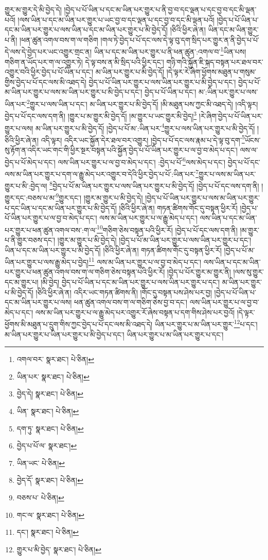 གྱུར་མ་གྱུར་དེ་མི་བྱེད་དེ། །བྱེད་པ་པོ་ཡིན་པ་དང་མ་ཡིན་པར་གྱུར་པ་ནི་བྱ་བ་དང་ལྡན་པ་དང་བྱ་བ་དང་མི་ལྡན་པའོ། །ལས་ཡིན་པ་དང་མ་ཡིན་པར་གྱུར་པ་ཡང་བྱ་བ་དང་ལྡན་པ་དང་བྱ་བ་དང་མི་ལྡན་པའོ། །བྱེད་པ་པོ་ཡིན་པ་དང་མ་ཡིན་པར་གྱུར་པ་ལས་ཡིན་པ་དང་མ་ཡིན་པར་གྱུར་པ་མི་བྱེད་དོ། །ཅིའི་ཕྱིར་ཞེ་ན། ཡིན་དང་མ་ཡིན་གྱུར་པ་ནི། །ཕན་ཚུན་འགལ་བས་ག་ལ་གཅིག །གལ་ཏེ་བྱེད་པ་པོ་དང་ལས་དེ་ལྟ་བུ་དག་སྲིད་པར་གྱུར་ན་ནི་བྱེད་པ་པོ་དེ་ལས་དེ་བྱེད་པར་ཡང་འགྱུར་གྲང་ན། ཡིན་པ་དང་མ་ཡིན་པར་གྱུར་པ་ནི་ཕན་ཚུན་:འགལ་བ་\footnote{འགལ་བར་  སྣར་ཐང་།  པེ་ཅིན། }ཡིན་པས། གཅིག་ན་ཡོད་པར་ག་ལ་འགྱུར་ཏེ། དེ་ལྟ་བས་ན་མི་སྲིད་པའི་ཕྱིར་དང་། གཉི་གའི་སྐྱོན་ཇི་སྐད་བསྟན་པར་ཐལ་བར་འགྱུར་བའི་ཕྱིར་བྱེད་པ་པོ་ཡིན་པ་དང་། མ་ཡིན་པར་གྱུར་པ་མི་བྱེད་དོ། །དེ་ལྟར་རེ་ཞིག་ཕྱོགས་མཐུན་པ་གསུམ་གྱིས་བྱེད་པ་པོ་དང་ལས་མི་འཐད་དེ། བྱེད་པ་པོ་ཡིན་པར་གྱུར་པ་ལས་ཡིན་པར་གྱུར་པ་མི་བྱེད་པ་དང་། བྱེད་པ་པོ་མ་ཡིན་པར་གྱུར་པ་ལས་མ་ཡིན་པར་གྱུར་པ་མི་བྱེད་པ་དང་། བྱེད་པ་པོ་ཡིན་པ་དང་། མ་:ཡིན་པར་གྱུར་པ་ལས་ཡིན་པར་\footnote{ཡིན་པར་  སྣར་ཐང་།  པེ་ཅིན། }གྱུར་པ་ལས་ཡིན་པ་དང་། མ་ཡིན་པར་གྱུར་པ་མི་བྱེད་དོ། །མི་མཐུན་པས་ཀྱང་མི་འཐད་དེ། །འདི་ལྟར། བྱེད་པ་པོ་དང་ལས་དག་ནི། །གྱུར་པ་མ་གྱུར་མི་བྱེད་དོ། །མ་གྱུར་པ་ཡང་གྱུར་མི་བྱེད།\footnote{བྱེད་དེ།  སྣར་ཐང་།  པེ་ཅིན། } །རེ་ཞིག་བྱེད་པ་པོ་ཡིན་པར་གྱུར་པ་ལས། མ་ཡིན་པར་གྱུར་པ་མི་བྱེད་དོ། །བྱེད་པ་པོ་མ་:ཡིན་པར་\footnote{ཡིན་  སྣར་ཐང་།  པེ་ཅིན། }གྱུར་པ་ལས་ཡིན་པར་གྱུར་པ་མི་བྱེད་དོ། །ཅིའི་ཕྱིར་ཞེ་ན། འདི་ལྟར། འདིར་ཡང་སྐྱོན་དེར་ཐལ་བར་འགྱུར། །བྱེད་པ་པོ་དང་ལས་རྣམ་པ་དེ་ལྟ་བུ་དག་\footnote{དག་ཏུ་  སྣར་ཐང་།  པེ་ཅིན། }ཡོངས་སུ་རྟོག་ན་འདིར་ཡང་གང་གི་ཕྱིར་སྔར་བསྟན་པའི་སྐྱོན་བྱེད་པ་པོ་ཡིན་པར་གྱུར་པ་ལ་བྱ་བ་མེད་པ་དང་། ལས་ལ་བྱེད་པ་པོ་མེད་པ་དང་། ལས་ཡིན་པར་གྱུར་པ་ལ་བྱ་བ་མེད་པ་དང་། :བྱེད་པ་པོ་\footnote{བྱེད་པ་པོ་ལ་  སྣར་ཐང་། }ལས་མེད་པ་དང་། བྱེད་པ་པོ་དང་ལས་མ་ཡིན་པར་གྱུར་པ་དག་ལ་རྒྱུ་མེད་པར་འགྱུར་བ་དེའི་ཕྱིར་བྱེད་པ་པོ་:ཡིན་པར་\footnote{ཡིན་ཡང་  པེ་ཅིན། }གྱུར་པ་ལས་མ་ཡིན་པར་གྱུར་པ་མི་:བྱེད་ལ། \footnote{བྱེད་དོ་  སྣར་ཐང་།  པེ་ཅིན། }བྱེད་པ་པོ་མ་ཡིན་པར་གྱུར་པ་ལས་ཡིན་པར་གྱུར་པ་མི་བྱེད་དོ། །བྱེད་པ་པོ་དང་ལས་དག་ནི། །གྱུར་དང་:བཅས་པ་མ་\footnote{བཅས་པ་  པེ་ཅིན། }གྱུར་དང་། །གྱུར་མ་གྱུར་པ་མི་བྱེད་དེ། །བྱེད་པ་པོ་ཡིན་པར་གྱུར་པ་ལས་མ་ཡིན་པར་གྱུར་པ་དང་ཡིན་པ་དང་མ་ཡིན་པར་གྱུར་པ་མི་བྱེད་དོ། །ཅིའི་ཕྱིར་ཞེ་ན། གཏན་ཚིགས་གོང་དུ་བསྟན་ཕྱིར་རོ། །བྱེད་པ་པོ་ཡིན་པར་གྱུར་པ་ལ་བྱ་བ་མེད་པ་དང་། ལས་མ་ཡིན་པར་གྱུར་པ་ལ་རྒྱུ་མེད་པ་དང་། ལས་ཡིན་པ་དང་མ་ཡིན་པར་གྱུར་པ་ཕན་ཚུན་འགལ་བས་:ག་ལ་\footnote{གང་ལ་  སྣར་ཐང་།  པེ་ཅིན། }གཅིག་ཅེས་བསྟན་པའི་ཕྱིར་རོ། །བྱེད་པ་པོ་དང་ལས་དག་ནི། །མ་གྱུར་པ་ནི་གྱུར་བཅས་དང་། །གྱུར་མ་གྱུར་པ་མི་བྱེད་དེ། །བྱེད་པ་པོ་མ་ཡིན་པར་གྱུར་པ་ལས་ཡིན་པར་གྱུར་པ་དང་། ཡིན་པ་དང་མ་ཡིན་པར་གྱུར་པ་མི་བྱེད་དོ། །ཅིའི་ཕྱིར་ཞེ་ན། གཏན་ཚིགས་གོང་དུ་བསྟན་ཕྱིར་རོ། །བྱེད་པ་པོ་མ་ཡིན་པར་གྱུར་པ་ལས་རྒྱུ་མེད་པ་བྱེད།\footnote{དང་།  སྣར་ཐང་།  པེ་ཅིན། } ལས་མ་ཡིན་པར་གྱུར་པ་ལ་བྱ་བ་མེད་པ་དང་། ལས་ཡིན་པ་དང་མ་ཡིན་པར་གྱུར་པ་ཕན་ཚུན་འགལ་བས་ག་ལ་གཅིག་ཅེས་བསྟན་པའི་ཕྱིར་རོ། །བྱེད་པ་པོར་གྱུར་མ་གྱུར་ནི། །ལས་སུ་གྱུར་དང་མ་གྱུར་པ། །མི་བྱེད། བྱེད་པ་པོ་ཡིན་པ་དང་མ་ཡིན་པར་གྱུར་པ་ལས་ཡིན་པར་གྱུར་པ་དང་། མ་ཡིན་པར་གྱུར་པ་མི་བྱེད་དོ། །ཅིའི་ཕྱིར་ཞེ་ན། འདིར་ཡང་གཏན་ཚིགས་ནི། །གོང་དུ་བསྟན་པས་ཤེས་པར་བྱ། །བྱེད་པ་པོ་ཡིན་པ་དང་མ་ཡིན་པར་གྱུར་པ་ལས། ཕན་ཚུན་འགལ་བས་ག་ལ་གཅིག་ཅེས་བྱ་བ་དང་། ལས་ཡིན་པར་གྱུར་པ་ལ་བྱ་བ་མེད་པ་དང་། ལས་མ་ཡིན་པར་གྱུར་པ་ལ་རྒྱུ་མེད་པར་འགྱུར་རོ་ཞེས་བསྟན་པ་དག་གིས་ཤེས་པར་བྱའོ། །དེ་ལྟར་ཕྱོགས་མི་མཐུན་པ་དྲུག་གིས་ཀྱང་བྱེད་པ་པོ་དང་ལས་མི་འཐད་དེ། ཡིན་པར་གྱུར་པ་མ་ཡིན་པར་གྱུར་\footnote{གྱུར་པ་མི་བྱེད་  སྣར་ཐང་།  པེ་ཅིན། }པ་དང་། མ་ཡིན་པར་གྱུར་པ་ཡིན་པར་གྱུར་པ་མི་བྱེད་པ་དང་། ཡིན་པར་གྱུར་པ་མ་ཡིན་པར་གྱུར་པ་དང་། 